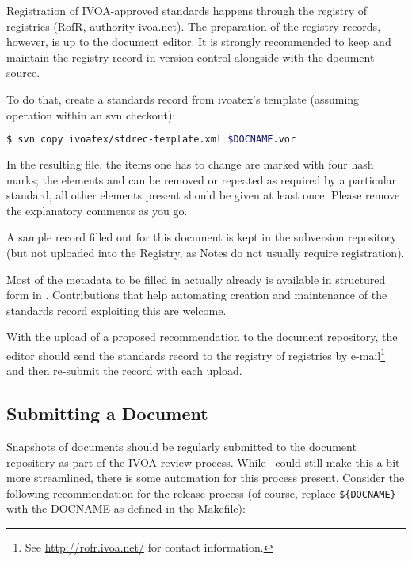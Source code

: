 \documentclass[11pt,a4paper]{ivoa}
\begin{document}
Registration of IVOA-approved standards happens through the registry of
registries (RofR, authority ivoa.net).  The preparation of the registry
records, however, is up to the document editor.  It is strongly
recommended to keep and maintain the registry record in version control
alongside with the document source.

To do that, create a standards record from ivoatex's template (assuming
operation within an svn checkout):

\begin{lstlisting}[language=sh]
$ svn copy ivoatex/stdrec-template.xml $DOCNAME.vor
\end{lstlisting}

In the resulting file, the items one has to change are marked with four
hash marks; the elements  and  can be removed
or repeated as required by a particular standard, all other elements
present should be given at least once.  Please remove the explanatory
comments as you go. 

A sample record filled out for this document is kept in the subversion
repository (but not uploaded into the Registry, as Notes do not usually
require registration).

Most of the metadata to be filled in actually already is available in
structured form in \ivoatex.  Contributions that help automating
creation and maintenance of the standards record exploiting this are welcome.

With the upload of a proposed recommendation to the document repository,
the editor should send the standards record to the registry of
registries by e-mail\footnote{See \url{http://rofr.ivoa.net/} for
contact information.} and then re-submit the record with each upload.

\subsection{Submitting a Document}

Snapshots of documents should be regularly submitted to the document
repository as part of the IVOA review process.  While \ivoatex~could
still make this a bit more streamlined, there is some automation for
this process present.  Consider the following recommendation for the
release process (of course, replace \verb|${DOCNAME}| with the DOCNAME
as defined in the Makefile):
\end{document}
